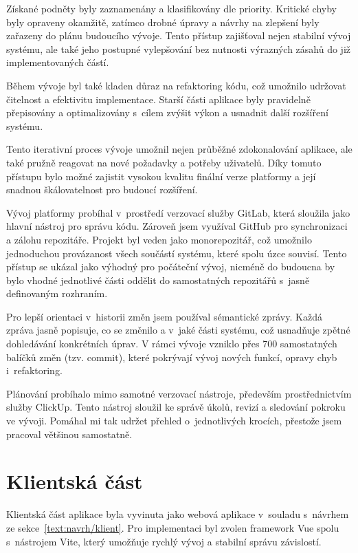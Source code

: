 Získané podněty byly zaznamenány a klasifikovány dle priority. 
Kritické chyby byly opraveny okamžitě, zatímco drobné úpravy a návrhy na zlepšení byly zařazeny do plánu budoucího vývoje. 
Tento přístup zajišťoval nejen stabilní vývoj systému, ale také jeho postupné vylepšování bez nutnosti výrazných zásahů do již implementovaných částí.

Během vývoje byl také kladen důraz na refaktoring kódu, což umožnilo udržovat čitelnost a efektivitu implementace. 
Starší části aplikace byly pravidelně přepisovány a optimalizovány s~cílem zvýšit výkon a usnadnit další rozšíření systému.

Tento iterativní proces vývoje umožnil nejen průběžné zdokonalování aplikace, ale také pružně reagovat na nové požadavky a potřeby uživatelů. 
Díky tomuto přístupu bylo možné zajistit vysokou kvalitu finální verze platformy a její snadnou škálovatelnost pro budoucí rozšíření.

Vývoj platformy probíhal v~prostředí verzovací služby GitLab, která sloužila jako hlavní nástroj pro správu kódu. 
Zároveň jsem využíval GitHub pro synchronizaci a zálohu repozitáře. 
Projekt byl veden jako monorepozitář, což umožnilo jednoduchou provázanost všech součástí systému, které spolu úzce souvisí. 
Tento přístup se ukázal jako výhodný pro počáteční vývoj, nicméně do budoucna by bylo vhodné jednotlivé části oddělit do samostatných repozitářů s~jasně definovaným rozhraním.

Pro lepší orientaci v~historii změn jsem používal sémantické zprávy. 
Každá zpráva jasně popisuje, co se změnilo a v~jaké části systému, což usnadňuje zpětné dohledávání konkrétních úprav. 
V rámci vývoje vzniklo přes 700 samostatných balíčků změn (tzv. commit), které pokrývají vývoj nových funkcí, opravy chyb i~refaktoring.

Plánování probíhalo mimo samotné verzovací nástroje, především prostřednictvím služby ClickUp. 
Tento nástroj sloužil ke správě úkolů, revizí a sledování pokroku ve vývoji. 
Pomáhal mi tak udržet přehled o~jednotlivých krocích, přestože jsem pracoval většinou samostatně.


\section{Klientská část}\label{text:realizace/klient}

Klientská část aplikace byla vyvinuta jako webová aplikace v~souladu s~návrhem ze sekce~\ref{text:navrh/klient}. 
Pro implementaci byl zvolen framework Vue spolu s~nástrojem Vite, který umožňuje rychlý vývoj a stabilní správu závislostí.


